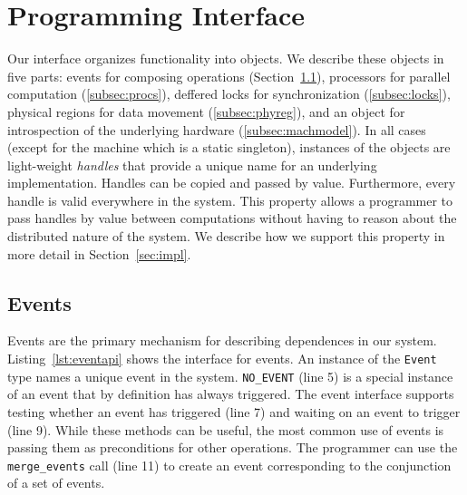 
\section{Programming Interface}
\label{sec:interface}

Our interface organizes functionality into objects.  We describe
these objects in five parts: events for composing operations 
(Section~\ref{subsec:events}), processors for parallel computation 
(\ref{subsec:procs}), deffered locks for synchronization
(\ref{subsec:locks}), physical regions for data movement
(\ref{subsec:phyreg}), and an object for introspection of the underlying
hardware (\ref{subsec:machmodel}).  In all cases (except for the
machine which is a static singleton), instances of the objects
are light-weight {\em handles} that provide a unique name for an underlying
implementation.  Handles can be copied and passed by value.  Furthermore,
every handle is valid everywhere in the system.  This property allows 
a programmer to pass handles by value between computations without
having to reason about the distributed nature of the system.
We describe how we support this property in more detail in 
Section~\ref{sec:impl}.

\lstset{
  captionpos=b,
  language=C++,
  basicstyle=\scriptsize,
  numbers=left,
  numberstyle=\tiny,
  columns=fullflexible,
  stepnumber=1,
  escapechar=\#,
  keepspaces=true,
}

\subsection{Events}
\label{subsec:events}
Events are the primary mechanism for describing dependences in our system.
Listing~\ref{lst:eventapi} shows the interface for events.  An instance of the {\tt Event} type 
names a unique event in the system.  {\tt NO\_EVENT} (line 5) is a special instance
of an event that by definition has always triggered.  The event interface
supports testing whether an event has triggered (line 7) and waiting on
an event to trigger (line 9).  While these methods can be useful, the most common
use of events is passing them as preconditions for other operations.  The programmer can use the
{\tt merge\_events} call (line 11) to create an event corresponding to the 
conjunction of a set of events.

